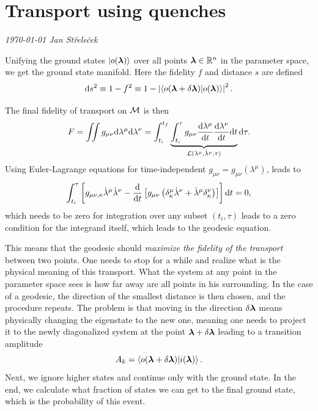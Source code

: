\chapter{Transport using quenches}
\textit{\today\newline
Jan Střeleček\newline}

\label{sec:quenches}
Unifying the ground states $\ket{o({\bm\lambda})}$ over all points ${\bm\lambda}\in\mathbb{R}^n$ in the parameter space, we get the ground state manifold. Here the fidelity $f$ and distance $s$ are defined
\begin{equation}
    \mathrm{d} s^2 \equiv 1-f^2\equiv 1-\left|\braket{o(\bm{{\bm\lambda}}+\delta\bm{{\bm\lambda}})|o(\bm{{\bm\lambda}})}\right|^2.
    \label{eq:distanceOnM0}
\end{equation}

The final fidelity of transport on $\mathcal{M}$ is then
\begin{equation}
    F=\iint g_{\mu\nu}\mathrm{d}\lambda^\mu\mathrm{d}\lambda^\nu = \int_{t_i}^{t_f}\underbrace{\int_{t_i}^\tau g_{\mu\nu}\frac{\mathrm{d} \lambda^\mu}{\mathrm{d} t}\frac{\mathrm{d} \lambda^\nu}{\mathrm{d} t} \mathrm{d} t}_{\mathcal{L}(\lambda^\mu,\dot\lambda^\mu,\tau)}\mathrm{d} \tau .
\end{equation}
Using Euler-Lagrange equations for time-independent $g_{\mu\nu}=g_{\mu\nu}(\lambda^\mu)$, leads to
\begin{equation}
    \int_{t_i}^{\tau}\left[g_{\mu\nu,\kappa}\dot\lambda^\mu\dot\lambda^\nu - \frac{\mathrm{d} }{\mathrm{d} t}\left[g_{\mu\nu}\left(\delta^\mu_\kappa\dot\lambda^\nu+\dot\lambda^\mu\delta^\nu_\kappa\right)\right]\right]\mathrm{d} t=0,
\end{equation}
which needs to be zero for integration over any subset $(t_i,\tau)$ leads to a zero condition for the integrand itself, which leads to the geodesic equation.

This means that the geodesic should \emph{maximize the fidelity of the transport} between two points. One needs to stop for a while and realize what is the physical meaning of this transport. What the system at any point in the parameter space sees is how far away are all points in his surrounding. In the case of a geodesic, the direction of the smallest distance is then chosen, and the procedure repeats. The problem is that moving in the direction $\delta{\bm\lambda}$ means physically changing the eigenstate to the new one, meaning one needs to project it to the newly diagonalized system at the point ${\bm\lambda}+\delta{\bm\lambda}$ leading to a transition amplitude
$$A_k=\braket{o(\bm{{\bm\lambda}}+\delta\bm{{\bm\lambda}})|i(\bm{{\bm\lambda}})}.$$
Next, we ignore higher states and continue only with the ground state. In the end, we calculate what fraction of states we can get to the final ground state, which is the probability of this event. 
 
